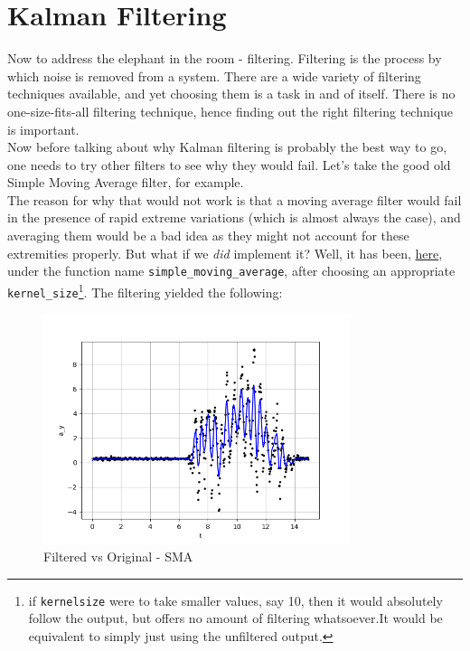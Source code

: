 \documentclass[oneside]{book}
\begin{document}
\chapter{Kalman Filtering}
Now to address the elephant in the room - filtering. Filtering is the process by which noise is removed from a system. There are a wide variety of filtering techniques available, and yet choosing them is a task in and of itself. There is no one-size-fits-all filtering technique, hence finding out the right filtering technique is important.\\ 
\bigskip
Now before talking about why Kalman filtering is probably the best way to go, one needs to try other filters to see why they would fail. Let's take the good old Simple Moving Average filter, for example. \\
The reason for why that would not work is that a moving average filter would fail in the presence of rapid extreme variations (which is almost always the case), and averaging them would be a bad idea as they might not account for these extremities properly.
But what if we \textit{did} implement it? Well, it has been, \href{https://github.com/HarryNyquist/Odometry/blob/main/Odomtery_Bad_Tries/Bad_Filter_attempts.py}{here}, under the function name \verb|simple_moving_average|, after choosing an appropriate \\ \verb|kernel_size|\footnote{if \texttt{kernel\textunderscore size} were to take smaller values, say 10, then it would absolutely follow the output, but offers no amount of filtering whatsoever.It would be equivalent to simply just using the unfiltered output.}. The filtering yielded the following:
\begin{figure}[htbp]
    \centering
    \includegraphics[width=0.8\textwidth]{figs/Filtered_using_SMA_downsampled.png}
    \caption{Filtered vs Original - SMA}
\end{figure}
\end{document}
